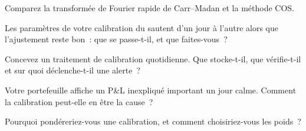 \begin{interviewq}\label{iq:dv:fourier-pricing-and-calibration-engineering:2}
Comparez la transformée de Fourier rapide de Carr--Madan et la méthode COS.
\end{interviewq}

\begin{interviewq}\label{iq:dv:fourier-pricing-and-calibration-engineering:3}
Les paramètres de votre calibration du  sautent d'un jour à l'autre alors que l'ajustement reste bon~: que se passe-t-il, et que faites-vous~?
\end{interviewq}

\begin{interviewq}\label{iq:dv:fourier-pricing-and-calibration-engineering:4}
Concevez un traitement de calibration quotidienne. Que stocke-t-il, que vérifie-t-il et sur quoi déclenche-t-il une alerte~?
\end{interviewq}

\begin{interviewq}\label{iq:dv:fourier-pricing-and-calibration-engineering:5}
Votre portefeuille affiche un P\&L inexpliqué important un jour calme. Comment la calibration peut-elle en être la cause~?
\end{interviewq}

\begin{interviewq}\label{iq:dv:fourier-pricing-and-calibration-engineering:6}
Pourquoi pondéreriez-vous une calibration, et comment choisiriez-vous les poids~?
\end{interviewq}
